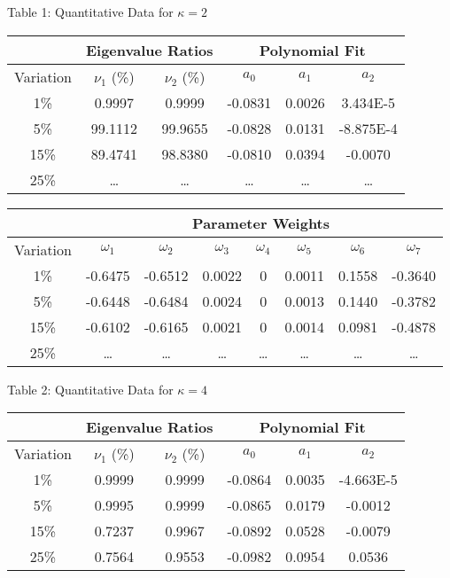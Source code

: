 \documentclass{article}
\begin{document}
\newpage
\begin{center}
Table 1: Quantitative Data for $\kappa = 2$

\begin{tabular}{|c||c|c||c|c|c|}
	\hline & \multicolumn{2}{c||}{\textbf{Eigenvalue Ratios}} & \multicolumn{3}{c|}{\textbf{Polynomial Fit}} \\ \hline
	Variation & $\nu_1$ (\%) & $\nu_2$ (\%) & $a_0$ & $a_1$ & $a_2$ \\ \hline \hline
	1\% & 0.9997 & 0.9999 & -0.0831 & 0.0026 & 3.434E-5 \\ \hline
	5\% & 99.1112 & 99.9655 & -0.0828 & 0.0131 & -8.875E-4 \\ \hline
	15\% & 89.4741 & 98.8380 & -0.0810 & 0.0394 & -0.0070 \\ \hline
	25\% & \ldots & \ldots & \ldots & \ldots & \ldots \\ \hline
\end{tabular}

\begin{tabular}{|c||c|c|c|c|c|c|c|}
	\hline & \multicolumn{7}{c|}{\textbf{Parameter Weights}} \\ \hline
	Variation & $\omega_1$ & $\omega_2$ & $\omega_3$ & $\omega_4$ & $\omega_5$ & $\omega_6$ & $\omega_7$ \\ \hline \hline
	1\% & -0.6475 & -0.6512 & 0.0022 & 0 & 0.0011 & 0.1558 & -0.3640 \\ \hline
	5\% & -0.6448 & -0.6484 & 0.0024 & 0 & 0.0013 & 0.1440 & -0.3782 \\ \hline
	15\% & -0.6102 & -0.6165 & 0.0021 & 0 & 0.0014 & 0.0981 & -0.4878 \\ \hline
	25\% & \ldots & \ldots & \ldots & \ldots & \ldots & \ldots & \ldots \\ \hline
\end{tabular}


\vspace{0.5in} Table 2: Quantitative Data for $\kappa = 4$

\begin{tabular}{|c||c|c||c|c|c|}
	\hline & \multicolumn{2}{c||}{\textbf{Eigenvalue Ratios}} & \multicolumn{3}{c|}{\textbf{Polynomial Fit}} \\ \hline
	Variation & $\nu_1$ (\%) & $\nu_2$ (\%) & $a_0$ & $a_1$ & $a_2$ \\ \hline \hline
	1\% & 0.9999 & 0.9999 & -0.0864 & 0.0035 & -4.663E-5 \\ \hline
	5\% & 0.9995 & 0.9999 & -0.0865 & 0.0179 & -0.0012 \\ \hline
	15\% & 0.7237 & 0.9967 & -0.0892 & 0.0528 & -0.0079 \\ \hline
	25\% & 0.7564 & 0.9553 & -0.0982 & 0.0954 & 0.0536 \\ \hline
\end{tabular}


\end{center}
\end{document}
